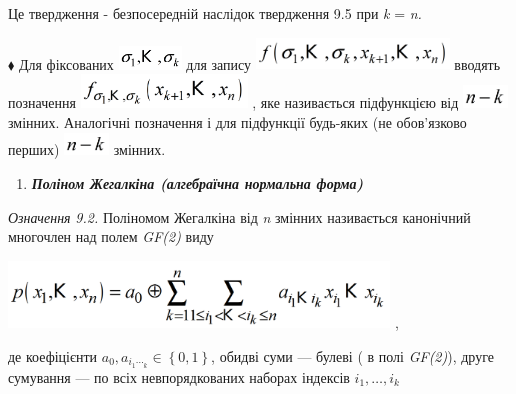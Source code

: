  Це твердження  {}- безпосередній наслідок твердження  9.5\textit{  }при 
\textit{k}\textit{ }=\textit{ }\textit{n}\textit{.}

${\blacklozenge}$ Для фіксованих 
\includegraphics[width=0.6571in,height=0.248in]{crypt-img/crypt-img113.png} 
для запису 
\includegraphics[width=2.0201in,height=0.3346in]{crypt-img/crypt-img114.png} 
вводять позначення 
\includegraphics[width=1.7398in,height=0.3535in]{crypt-img/crypt-img115.png} , 
яке називається підфункцією від  
\includegraphics[width=0.4681in,height=0.2409in]{crypt-img/crypt-img116.png} 
змінних. Аналогічні позначення і для підфункції будь-яких (не обов’язково
перших) 
\includegraphics[width=0.4681in,height=0.2409in]{crypt-img/crypt-img117.png}
змінних. 


\bigskip

\liststyleWWviiiNumlii
\begin{enumerate}
\item {\bfseries\itshape
Поліном Жегалкіна (алгебраїчна  нормальна форма)}
\end{enumerate}
 \textit{Означення }\textit{9.}\textit{2.}\textit{  }Поліномом Жегалкіна від
\textit{n} змінних називається канонічний многочлен над полем \textit{GF(2)
}\textit{ }виду

{\centering
 \includegraphics[width=3.9835in,height=0.7in]{crypt-img/crypt-img118.png} , 
\par}

де коефіцієнти   ${a_{{0}},a_{{i_{{1}}\dotsi_{{k}}}}\in
\left\{0,1\right\}}$, обидві суми --- булеві ( в полі \textit{GF(2)}), друге
сумування --- по всіх невпорядкованих наборах  індексів 
${i_{{1}},\dots,i_{{k}}}$\textit{ }\textit{ }

